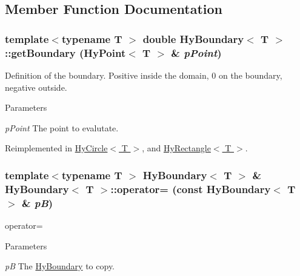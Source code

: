 \subsection{Member Function Documentation}
\hypertarget{classHyBoundary_a138c96a97075dc41eead25963c1bf785}{
\subsubsection[{getBoundary}]{\setlength{\rightskip}{0pt plus 5cm}template$<$typename T $>$ double {\bf HyBoundary}$<$ T $>$::getBoundary ({\bf HyPoint}$<$ T $>$ \& {\em pPoint})}}
\label{classHyBoundary_a138c96a97075dc41eead25963c1bf785}


Definition of the boundary. Positive inside the domain, 0 on the boundary, negative outside. 


\begin{DoxyParams}{Parameters}
\item[{\em pPoint}]The point to evalutate. \end{DoxyParams}


Reimplemented in \hyperlink{classHyCircle_aed6e84c3e2e99b8f84aa1b723224f4c5}{HyCircle$<$ T $>$}, and \hyperlink{classHyRectangle_a881f7ed847a94d1af3ff4ff0d60ee516}{HyRectangle$<$ T $>$}.

\hypertarget{classHyBoundary_a0e9c5e3a7b5c161bd47e98ca0e265fc5}{
\subsubsection[{operator=}]{\setlength{\rightskip}{0pt plus 5cm}template$<$typename T $>$ {\bf HyBoundary}$<$ T $>$ \& {\bf HyBoundary}$<$ T $>$::operator= (const {\bf HyBoundary}$<$ T $>$ \& {\em pB})}}
\label{classHyBoundary_a0e9c5e3a7b5c161bd47e98ca0e265fc5}


operator= 


\begin{DoxyParams}{Parameters}
\item[{\em pB}]The \hyperlink{classHyBoundary}{HyBoundary} to copy. \end{DoxyParams}


